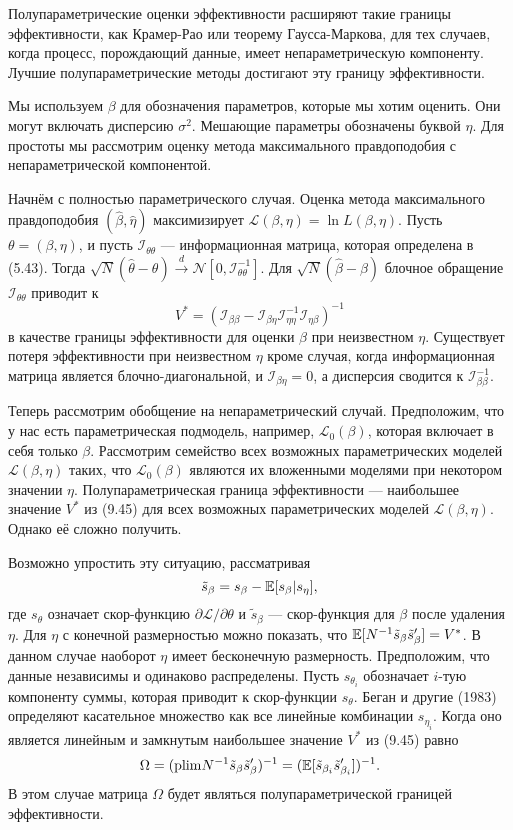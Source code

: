 Полупараметрические оценки эффективности расширяют такие границы эффективности, как Крамер-Рао или теорему Гаусса-Маркова, для тех случаев, когда процесс, порождающий данные, имеет непараметрическую компоненту. Лучшие полупараметрические методы достигают эту границу эффективности.

Мы используем $\beta$ для обозначения параметров, которые мы хотим оценить. Они могут включать дисперсию $\sigma^2$. Мешающие параметры обозначены буквой $\eta$. Для простоты мы рассмотрим оценку метода максимального правдоподобия с непараметрической компонентой.

Начнём с полностью параметрического случая. Оценка метода максимального правдоподобия $(\hat{\beta},\hat{\eta})$ максимизирует $\mathcal{L}(\beta, \eta) = \ln L(\beta, \eta)$. Пусть $\theta = (\beta, \eta)$, и пусть $\mathcal{I}_{\theta \theta}$ --- информационная матрица, которая определена в (5.43). Тогда $\sqrt{N}(\hat{\theta} - \theta) \stackrel{d}{\rightarrow} \mathcal{N}[0, \mathcal{I}_{\theta \theta}^{-1}]$. Для $\sqrt{N}(\hat{\beta} - \beta)$ блочное обращение $\mathcal{I}_{\theta \theta}$ приводит к 
\begin{equation}
V^* = (\mathcal{I}_{\beta \beta} - \mathcal{I}_{\beta \eta} \mathcal{I}_{\eta \eta}^{-1} \mathcal{I}_{\eta \beta})^{-1}
\end{equation}
в качестве границы эффективности для оценки $\beta$ при неизвестном $\eta$. Существует потеря эффективности
при неизвестном $\eta$ кроме случая, когда информационная матрица является блочно-диагональной, и $\mathcal{I}_{\beta \eta} = 0$, а дисперсия сводится к $\mathcal{I}_{\beta \beta}^{-1}$.

Теперь рассмотрим обобщение на непараметрический случай. Предположим, что у нас есть параметрическая подмодель, например, $\mathcal{L}_0(\beta)$, которая включает в себя только $\beta$. Рассмотрим семейство всех возможных параметрических моделей $\mathcal{L}(\beta, \eta)$ таких, что $\mathcal{L}_0(\beta)$ являются их вложенными моделями при некотором значении $\eta$. Полупараметрическая граница эффективности --- наибольшее значение $V^*$ из (9.45) для всех возможных параметрических моделей $\mathcal{L}(\beta, \eta)$. Однако её сложно получить.

Возможно упростить эту ситуацию, рассматривая
\[
\tilde{s}_{\beta} = s_{\beta} - \mathbb{E}[s_{\beta}|s_{\eta}],
\]
где $s_{\theta}$ означает скор-функцию $\partial{\mathcal{L}}/\partial{\theta}$ и $\tilde{s}_{\beta}$ --- скор-функция для $\beta$ после удаления $\eta$. Для $\eta$ с конечной размерностью можно показать, что $\mathbb{E}[N^{-1}\tilde{s}_{\beta}\tilde{s}_{\beta}'] = V^*$. В данном случае наоборот $\eta$ имеет бесконечную размерность. Предположим, что данные независимы и одинаково распределены. Пусть $s_{\theta_i}$ обозначает $i$-тую компоненту суммы, которая приводит к скор-функции $s_{\theta}$. Беган и другие (1983) определяют касательное множество как все линейные комбинации $s_{\eta_i}$. Когда оно является линейным и замкнутым наибольшее значение $V^*$ из (9.45) равно
\[
\Omega = (\mathrm{plim } N^{-1}\tilde{s}_{\beta}\tilde{s}_{\beta}')^{-1} = (\mathbb{E}[\tilde{s}_{\beta_i} \tilde{s}_{\beta_i}'])^{-1}.
\]
В этом случае матрица $\Omega$ будет являться полупараметрической границей эффективности.

